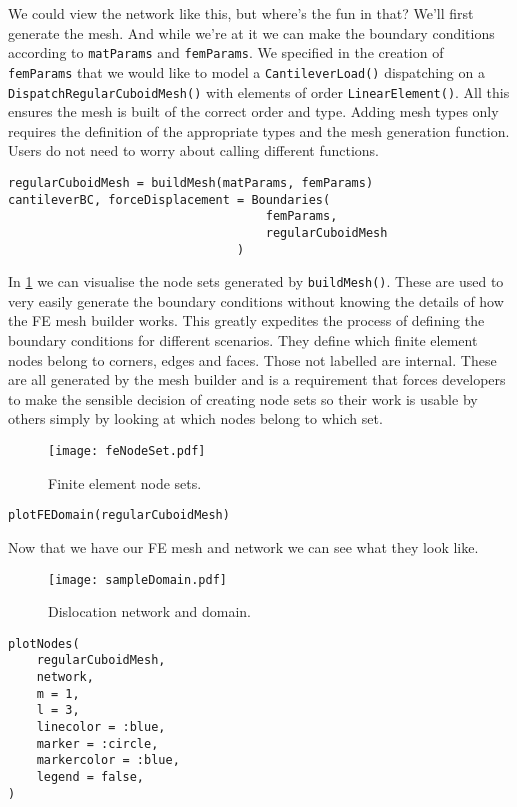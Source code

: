 We could view the network like this, but where's the fun in that? We'll first generate the mesh. And while we're at it we can make the boundary conditions according to \texttt{matParams} and \texttt{femParams}. We specified in the creation of \texttt{femParams} that we would like to model a \texttt{CantileverLoad()} dispatching on a \texttt{DispatchRegularCuboidMesh()} with elements of order \texttt{LinearElement()}. All this ensures the mesh is built of the correct order and type. Adding mesh types only requires the definition of the appropriate types and the mesh generation function. Users do not need to worry about calling different functions.
\begin{verbatim}
regularCuboidMesh = buildMesh(matParams, femParams)
cantileverBC, forceDisplacement = Boundaries(
                                    femParams, 
                                    regularCuboidMesh
                                )
\end{verbatim}
In \cref{f:feNodeSet} we can visualise the node sets generated by \texttt{buildMesh()}. These are used to very easily generate the boundary conditions without knowing the details of how the FE mesh builder works. This greatly expedites the process of defining the boundary conditions for different scenarios. They define which finite element nodes belong to corners, edges and faces. Those not labelled are internal. These are all generated by the mesh builder and is a requirement that forces developers to make the sensible decision of creating node sets so their work is usable by others simply by looking at which nodes belong to which set.
\begin{figure}
    \centering
    \texttt{[image: feNodeSet.pdf]}
    \caption[Finite element node sets.]{Finite element node sets.}
    \label{f:feNodeSet}
\end{figure}
\begin{verbatim}
plotFEDomain(regularCuboidMesh)
\end{verbatim}

Now that we have our FE mesh and network we can see what they look like.
\begin{figure}
    \centering
    \texttt{[image: sampleDomain.pdf]}
    \caption[Sample network and domain.]{Dislocation network and domain.}
\end{figure}
\begin{verbatim}
plotNodes(
    regularCuboidMesh,
    network,
    m = 1,
    l = 3,
    linecolor = :blue,
    marker = :circle,
    markercolor = :blue,
    legend = false,
)
\end{verbatim}

